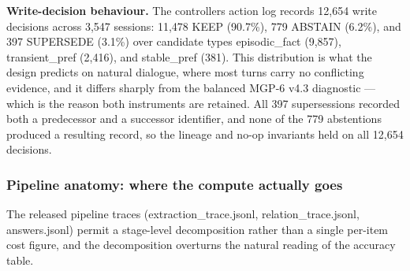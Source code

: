 \textbf{Write-decision behaviour.} The controller\textquotesingle s
action log records 12,654 write decisions across 3,547 sessions: 11,478
KEEP (90.7\%), 779 ABSTAIN (6.2\%), and 397 SUPERSEDE (3.1\%) over
candidate types episodic\_fact (9,857), transient\_pref (2,416), and
stable\_pref (381). This distribution is what the design predicts on
natural dialogue, where most turns carry no conflicting evidence, and it
differs sharply from the balanced MGP-6 v4.3 diagnostic --- which is the
reason both instruments are retained. All 397 supersessions recorded
both a predecessor and a successor identifier, and none of the 779
abstentions produced a resulting record, so the lineage and no-op
invariants held on all 12,654 decisions.

\subsubsection{Pipeline anatomy: where the compute actually
goes}\label{pipeline-anatomy-where-the-compute-actually-goes}

The released pipeline traces (extraction\_trace.jsonl,
relation\_trace.jsonl, answers.jsonl) permit a stage-level decomposition
rather than a single per-item cost figure, and the decomposition
overturns the natural reading of the accuracy table.

